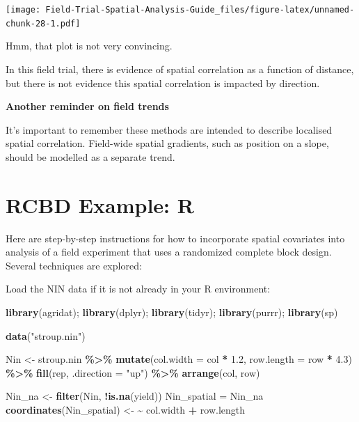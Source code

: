 \documentclass[
]{book}
\newenvironment{Shaded}{\begin{snugshade}}{\end{snugshade}}
\newcommand{\AttributeTok}[1]{\textcolor[rgb]{0.13,0.29,0.53}{#1}}
\newcommand{\ErrorTok}[1]{\textcolor[rgb]{0.64,0.00,0.00}{\textbf{#1}}}
\newcommand{\FloatTok}[1]{\textcolor[rgb]{0.00,0.00,0.81}{#1}}
\newcommand{\FunctionTok}[1]{\textcolor[rgb]{0.13,0.29,0.53}{\textbf{#1}}}
\newcommand{\NormalTok}[1]{#1}
\newcommand{\OtherTok}[1]{\textcolor[rgb]{0.56,0.35,0.01}{#1}}
\newcommand{\SpecialCharTok}[1]{\textcolor[rgb]{0.81,0.36,0.00}{\textbf{#1}}}
\newcommand{\StringTok}[1]{\textcolor[rgb]{0.31,0.60,0.02}{#1}}
\begin{document}
\texttt{[image: Field-Trial-Spatial-Analysis-Guide\_files/figure-latex/unnamed-chunk-28-1.pdf]}

Hmm, that plot is not very convincing.

In this field trial, there is evidence of spatial correlation as a function of distance, but there is not evidence this spatial correlation is impacted by direction.

\textbf{Another reminder on field trends}

It's important to remember these methods are intended to describe localised spatial correlation. Field-wide spatial gradients, such as position on a slope, should be modelled as a separate trend.

\hypertarget{rcbd-r}{%
\chapter{RCBD Example: R}\label{rcbd-r}}

Here are step-by-step instructions for how to incorporate spatial covariates into analysis of a field experiment that uses a randomized complete block design. Several techniques are explored:

Load the NIN data if it is not already in your R environment:

\begin{Shaded}
\begin{Highlighting}[]
\FunctionTok{library}\NormalTok{(agridat); }\FunctionTok{library}\NormalTok{(dplyr); }\FunctionTok{library}\NormalTok{(tidyr); }\FunctionTok{library}\NormalTok{(purrr);}
\FunctionTok{library}\NormalTok{(sp)}
\end{Highlighting}
\end{Shaded}

\begin{Shaded}
\begin{Highlighting}[]
\FunctionTok{data}\NormalTok{(}\StringTok{"stroup.nin"}\NormalTok{)}

\NormalTok{Nin }\OtherTok{\textless{}{-}}\NormalTok{ stroup.nin }\SpecialCharTok{\%\textgreater{}\%} \FunctionTok{mutate}\NormalTok{(}\AttributeTok{col.width =}\NormalTok{ col }\SpecialCharTok{*} \FloatTok{1.2}\NormalTok{, }
                             \AttributeTok{row.length =}\NormalTok{ row }\SpecialCharTok{*} \FloatTok{4.3}\NormalTok{) }\SpecialCharTok{\%\textgreater{}\%} 
  \FunctionTok{fill}\NormalTok{(rep, }\AttributeTok{.direction =} \StringTok{"up"}\NormalTok{) }\SpecialCharTok{\%\textgreater{}\%}  \FunctionTok{arrange}\NormalTok{(col, row) }

\NormalTok{Nin\_na }\OtherTok{\textless{}{-}} \FunctionTok{filter}\NormalTok{(Nin, }\SpecialCharTok{!}\FunctionTok{is.na}\NormalTok{(yield))}
\NormalTok{Nin\_spatial }\OtherTok{=}\NormalTok{ Nin\_na}
\FunctionTok{coordinates}\NormalTok{(Nin\_spatial) }\OtherTok{\textless{}{-}} \ErrorTok{\textasciitilde{}}\NormalTok{ col.width }\SpecialCharTok{+}\NormalTok{ row.length}
\end{Highlighting}
\end{Shaded}
\end{document}
